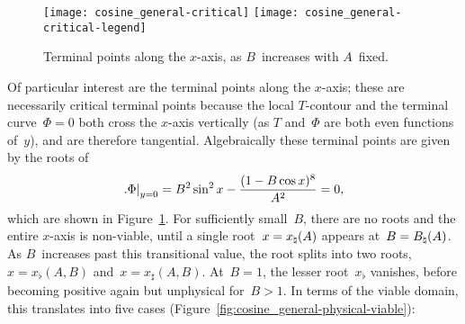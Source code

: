 \begin{figure}
  \newcommand*{\legendoffsetheight}{0.1\textwidth}
  \centering
  \texttt{[image: cosine\_general-critical]}
  \texttt{[image: cosine\_general-critical-legend]}
  \caption{
    Terminal points along the $x$-axis, as $B$~increases with $A$~fixed.
  }
  \label{fig:cosine_general-critical}
\end{figure}

Of particular interest are the terminal points along the $x$-axis;
these are necessarily critical terminal points
because the local $T$-contour and the terminal curve~$\Phi = 0$
both cross the $x$-axis vertically
(as $T$ and~$\Phi$ are both even functions of~$y$),
and are therefore tangential.
Algebraically these terminal points are given by the roots of
\begin{equation}
  \eval[\textsize]{\Phi}_{y=0}
  = B^2 \sin^2 x - \frac{(1 - B \cos x)^8}{A^2}
  = 0,
  \label{eq:cosine-general-critical-terminal-point-x}
\end{equation}
which are shown in Figure~\ref{fig:cosine_general-critical}.
For sufficiently small~$B$,
there are no roots and the entire $x$-axis is non-viable,
until a single root~$x = x_\natural (A)$ appears at~$B = B_\natural (A)$.
As $B$~increases past this transitional value,
the root splits into two roots, $x = x_\flat (A, B)$ and~$x = x_\sharp (A, B)$.
At~$B = 1$, the lesser root~$x_\flat$ vanishes,
before becoming positive again but unphysical for~$B > 1$.
In terms of the viable domain, this translates into five cases
(Figure~\ref{fig:cosine_general-physical-viable}):
